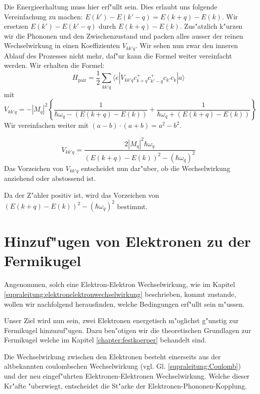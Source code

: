 \begin{refsection}
Die Energieerhaltung muss hier erf"ullt sein. 
Dies erlaubt uns folgende Vereinfachung zu machen:
$E(k')-E(k'-q) = E(k+q)-E(k)$. Wir ersetzen $E(k')-E(k'-q)$ durch $E(k+q)-E(k)$.
Zus"atzlich k"urzen wir die Phononen und den Zwischenzustand und packen
alles ausser der reinen Wechselwirkung in einen Koeffizienten $V_{kk'q}$.
Wir sehen nun zwar den inneren Ablauf des Prozesses nicht mehr, daf"ur kann die Formel
weiter vereinfacht werden.
Wir erhalten die Formel:
\begin{equation}
H_{\text{pair}}=
\frac{1}{2}
\sum \limits_{kk'q} 
\langle e|V_{kk'q}c^+_{k+q}c^+_{k'-q}c_{k'}c_k|a \rangle
\label{supraleitung:WechselwirkungKurz}
\end{equation}
mit
\begin{equation}
V_{kk'q} = - |M_q|^2 \left\{
\frac{1}{\hbar\omega_q-(E(k+q)-E(k))}
+
\frac{1}{\hbar\omega_q+(E(k+q)-E(k))}
\right\}
\label{supraleitung:WechselwirkungVkk'q}
\end{equation}
Wir vereinfachen weiter mit $(a-b)\cdot (a+b) = a^2-b^2$.

\begin{equation}
V_{kk'q} =
\frac
{2|M_q|^2\hbar\omega_q}
{(E(k+q)-E(k))^2-(\hbar\omega_q)^2}
\label{supraleitung:Wechselwirkung_Vkk'q_Kurz}
\end{equation}
Das Vorzeichen von $V_{kk'q}$ entscheidet nun dar"uber, ob die Wechselwirkung
anziehend oder abstossend ist.

Da der Z"ahler positiv ist, wird das Vorzeichen von $(E(k+q)-E(k))^2-(\hbar\omega_q)^2$ bestimmt.

\section{Hinzuf"ugen von Elektronen zu der Fermikugel}
Angenommen, solch eine Elektron-Elektron Wechselwirkung, wie im Kapitel
\ref{supraleitung:elektronelektronwechselwirkung} beschrieben, kommt zustande,
wollen wir nachfolgend herausfinden, welche Bedingungen erf"ullt sein m"ussen.

Unser Ziel wird nun sein, zwei Elektronen energetisch m"oglichst g"unstig zur Fermikugel hinzuzuf"ugen.
Dazu ben"otigen wir die theoretischen Grundlagen zur Fermikugel welche im Kapitel
\ref{chapter:festkoerper} behandelt sind.


Die Wechselwirkung zwischen den Elektronen besteht einerseits aus der altbekannten coulombschen
Wechselwirkung (vgl. Gl. \ref{supraleitung:Coulomb}) und der neu eingef"uhrten
Elektronen-Elektronen Wechselwirkung.
Welche dieser Kr"afte "uberwiegt, entscheidet die St"arke der Elektronen-Phononen-Kopplung.


\end{refsection}
